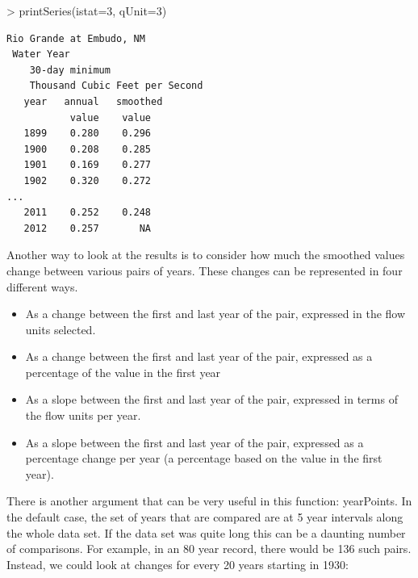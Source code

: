 \documentclass[a4paper,11pt]{article}
\begin{document}
\begin{Schunk}
\begin{Sinput}
> printSeries(istat=3, qUnit=3)
\end{Sinput}
\end{Schunk}

\begin{verbatim}
Rio Grande at Embudo, NM
 Water Year
    30-day minimum
    Thousand Cubic Feet per Second
   year   annual   smoothed
           value    value
   1899    0.280    0.296
   1900    0.208    0.285
   1901    0.169    0.277
   1902    0.320    0.272
...
   2011    0.252    0.248
   2012    0.257       NA
\end{verbatim}

Another way to look at the results is to consider how much the smoothed values change between various pairs of years.  These changes can be represented in four different ways.  
\begin{itemize}
  \item As a change between the first and last year of the pair, expressed in the flow units selected.
  \item As a change between the first and last year of the pair, expressed as a percentage of the value in the first year
  \item As a slope between the first and last year of the pair, expressed in terms of the flow units per year.
  \item As a slope between the first and last year of the pair, expressed as a percentage change per year (a percentage based on the value in the first year).
\end{itemize}

There is another argument that can be very useful in this function: yearPoints.  In the default case, the set of years that are compared are at 5 year intervals along the whole data set.  If the data set was quite long this can be a daunting number of comparisons.  For example, in an 80 year record, there would be 136 such pairs. Instead, we could look at changes for every 20 years starting in 1930: 
\end{document}
